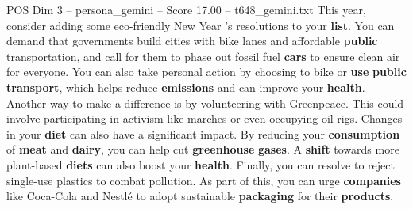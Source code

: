 \begin{textsample}{POS Dim 3 – persona\_gemini – Score 17.00 – t648\_gemini.txt}  \label{ex:f3_pos_048}
This year, consider adding some eco-friendly New Year 's resolutions to your \textbf{list}.
You can demand that governments build cities with bike lanes and affordable \textbf{public} transportation, and call for them to phase out fossil fuel \textbf{cars} to ensure clean air for everyone.
You can also take personal action by choosing to bike or \textbf{use} \textbf{public} \textbf{transport}, which helps reduce \textbf{emissions} and can improve your \textbf{health}.
Another way to make a difference is by volunteering with Greenpeace.
This could involve participating in activism like marches or even occupying oil rigs.
Changes in your \textbf{diet} can also have a significant impact.
By reducing your \textbf{consumption} of \textbf{meat} and \textbf{dairy}, you can help cut \textbf{greenhouse} \textbf{gases}.
A \textbf{shift} towards more plant-based \textbf{diets} can also boost your \textbf{health}.
Finally, you can resolve to reject single-use plastics to combat pollution.
As part of this, you can urge \textbf{companies} like Coca-Cola and Nestlé to adopt sustainable \textbf{packaging} for their \textbf{products}.

\end{textsample}
